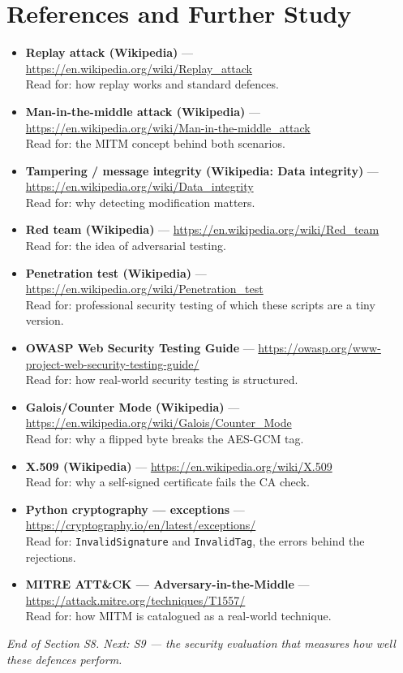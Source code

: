 \documentclass[11pt,a4paper]{article}
\begin{document}
\section{References and Further Study}
\begin{itemize}
  \item \textbf{Replay attack (Wikipedia)} ---
        \url{https://en.wikipedia.org/wiki/Replay_attack}\\
        Read for: how replay works and standard defences.
  \item \textbf{Man-in-the-middle attack (Wikipedia)} ---
        \url{https://en.wikipedia.org/wiki/Man-in-the-middle_attack}\\
        Read for: the MITM concept behind both scenarios.
  \item \textbf{Tampering / message integrity (Wikipedia: Data integrity)} ---
        \url{https://en.wikipedia.org/wiki/Data_integrity}\\
        Read for: why detecting modification matters.
  \item \textbf{Red team (Wikipedia)} ---
        \url{https://en.wikipedia.org/wiki/Red_team}\\
        Read for: the idea of adversarial testing.
  \item \textbf{Penetration test (Wikipedia)} ---
        \url{https://en.wikipedia.org/wiki/Penetration_test}\\
        Read for: professional security testing of which these scripts are a tiny version.
  \item \textbf{OWASP Web Security Testing Guide} ---
        \url{https://owasp.org/www-project-web-security-testing-guide/}\\
        Read for: how real-world security testing is structured.
  \item \textbf{Galois/Counter Mode (Wikipedia)} ---
        \url{https://en.wikipedia.org/wiki/Galois/Counter_Mode}\\
        Read for: why a flipped byte breaks the AES-GCM tag.
  \item \textbf{X.509 (Wikipedia)} ---
        \url{https://en.wikipedia.org/wiki/X.509}\\
        Read for: why a self-signed certificate fails the CA check.
  \item \textbf{Python cryptography --- exceptions} ---
        \url{https://cryptography.io/en/latest/exceptions/}\\
        Read for: \texttt{InvalidSignature} and \texttt{InvalidTag}, the errors
        behind the rejections.
  \item \textbf{MITRE ATT\&CK --- Adversary-in-the-Middle} ---
        \url{https://attack.mitre.org/techniques/T1557/}\\
        Read for: how MITM is catalogued as a real-world technique.
\end{itemize}

\vfill
\begin{center}\footnotesize\itshape
End of Section S8. Next: S9 --- the security evaluation that measures how well
these defences perform.
\end{center}
\end{document}
